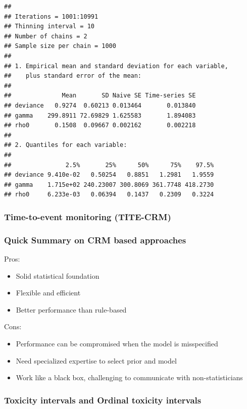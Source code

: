 \documentclass[
]{article}
\providecommand{\tightlist}{%
  \setlength{\itemsep}{0pt}\setlength{\parskip}{0pt}}
\begin{document}
\begin{verbatim}
## 
## Iterations = 1001:10991
## Thinning interval = 10 
## Number of chains = 2 
## Sample size per chain = 1000 
## 
## 1. Empirical mean and standard deviation for each variable,
##    plus standard error of the mean:
## 
##              Mean       SD Naive SE Time-series SE
## deviance   0.9274  0.60213 0.013464       0.013840
## gamma    299.8911 72.69829 1.625583       1.894083
## rho0       0.1508  0.09667 0.002162       0.002218
## 
## 2. Quantiles for each variable:
## 
##               2.5%       25%      50%      75%    97.5%
## deviance 9.410e-02   0.50254   0.8851   1.2981   1.9559
## gamma    1.715e+02 240.23007 300.8069 361.7748 418.2730
## rho0     6.233e-03   0.06394   0.1437   0.2309   0.3224
\end{verbatim}

\hypertarget{time-to-event-monitoring-tite-crm}{%
\subsubsection{Time-to-event monitoring
(TITE-CRM)}\label{time-to-event-monitoring-tite-crm}}

\hypertarget{quick-summary-on-crm-based-approaches}{%
\subsubsection{Quick Summary on CRM based
approaches}\label{quick-summary-on-crm-based-approaches}}

Pros:

\begin{itemize}
\tightlist
\item
  Solid statistical foundation
\item
  Flexible and efficient
\item
  Better performance than rule-based
\end{itemize}

Cons:

\begin{itemize}
\tightlist
\item
  Performance can be compromised when the model is misspecified
\item
  Need specialized expertise to select prior and model
\item
  Work like a black box, challenging to communicate with
  non-statisticians
\end{itemize}

\hypertarget{toxicity-intervals-and-ordinal-toxicity-intervals}{%
\subsubsection{Toxicity intervals and Ordinal toxicity
intervals}\label{toxicity-intervals-and-ordinal-toxicity-intervals}}
\end{document}
